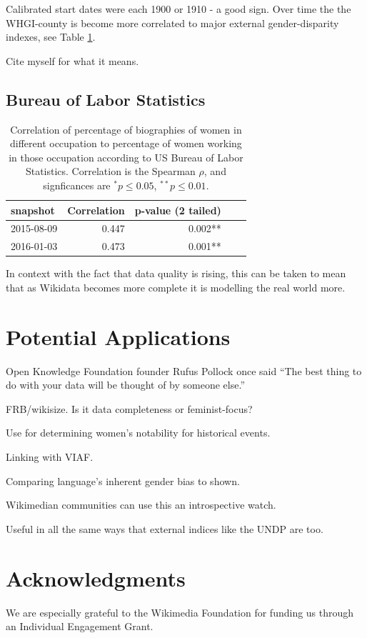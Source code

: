 \documentclass[letterpaper]{article}
\begin{document}
Calibrated start dates were each 1900 or 1910 - a good sign. Over time the the WHGI-county is become more correlated to major external gender-disparity indexes, see Table \ref{table:scores}.

Cite myself for what it means.


\subsection{Bureau of Labor Statistics}

\begin{table}
\caption{Correlation of percentage of biographies of women in different
occupation to percentage of women working in those occupation according to US
Bureau of Labor Statistics. Correlation is the Spearman $\rho$, and signficances are $ ^*p\leq 0.05 $, $ ^{**}p\leq 0.01$.}
\label{table:scores}
\begin{tabular}{lrrrr}
\toprule
snapshot &  Correlation  & p-value (2 tailed)  \\
\midrule
2015-08-09 & 0.447       & 0.002**  \\
2016-01-03 & 0.473       & 0.001**  \\
\bottomrule
\end{tabular}
\end{table}

 In context with the fact that data quality is rising, this can be taken to mean that as Wikidata becomes more complete it is modelling the real world more.

\section{Potential Applications}
Open Knowledge Foundation founder Rufus Pollock once said ``The best thing to do with your data will be thought of by someone else.”

FRB/wikisize. Is it data completeness or feminist-focus?


Use for determining women's notability for historical events.

Linking with VIAF. 

Comparing language's inherent gender bias to shown.

Wikimedian communities can use this an introspective watch.

Useful in all the same ways that external indices like the UNDP are too.


\section{ Acknowledgments}
We are especially grateful to the Wikimedia Foundation for funding us through an Individual Engagement Grant.



\end{document}
